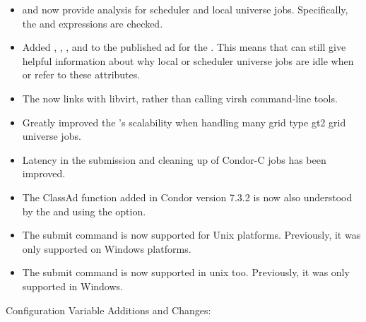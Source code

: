 \begin{itemize}

\item {}  and  now provide
  analysis for scheduler and local universe jobs.  Specifically, the
   and
   expressions are checked.

\item Added , ,
, and 
to the published ad for the .  This means that
  can still give helpful information about
why local or scheduler universe jobs are idle when
 or
 refer to these attributes.

\item The  now links with libvirt, rather than calling
virsh command-line tools.

\item Greatly improved the 's scalability when handling
many grid type gt2 grid universe jobs.

\item Latency in the submission and cleaning up of Condor-C jobs
has been improved.

\item The  ClassAd function added in Condor version 7.3.2
is now also understood by the  and
 using the  option.

\item The submit command  is now supported
for Unix platforms. Previously, it was only supported on Windows platforms.

\item The submit command  is now supported
in unix too. Previously, it was only supported in Windows.

\end{itemize}

\noindent Configuration Variable Additions and Changes:

